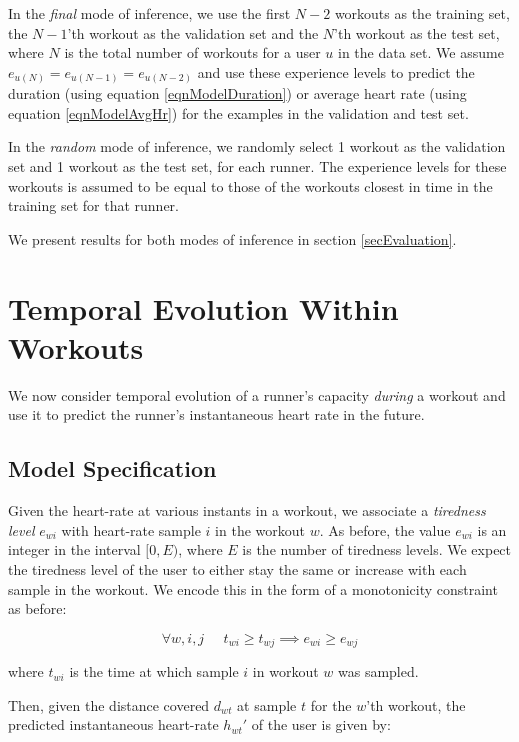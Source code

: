 \documentclass{acm_proc_article-sp}
\begin{document}
In the \emph{final} mode of inference, we use the first $N-2$ workouts as the training set, the $N-1$'th workout as the validation set and the $N$'th workout as the test set, where $N$ is the total number of workouts for a user $u$ in the data set. We assume $e_{u(N)} = e_{u(N-1)} = e_{u(N-2)}$ and use these experience levels to predict the duration (using equation \ref{eqnModelDuration}) or average heart rate (using equation \ref{eqnModelAvgHr}) for the examples in the validation and test set.

In the \emph{random} mode of inference, we randomly select 1 workout as the validation set and 1 workout as the test set, for each runner. The experience levels for these workouts is assumed to be equal to those of the workouts closest in time in the training set for that runner. 

We present results for both modes of inference in section \ref{secEvaluation}.

\section{Temporal Evolution Within \\ Workouts}
\label{secTemporalModelWorkouts}
We now consider temporal evolution of a runner's capacity \emph{during} a workout and use it to predict the runner's instantaneous heart rate in the future. 

\subsection{Model Specification}

Given the heart-rate at various instants in a workout, we associate a \emph{tiredness level} $e_{wi}$ with heart-rate sample $i$ in the workout $w$. As before, the value $e_{wi}$ is an integer in the interval $[0, E)$, where $E$ is the number of tiredness levels. We expect the tiredness level of the user to either stay the same or increase with each sample in the workout. We encode this in the form of a monotonicity constraint as before:

$$\forall w,i,j \;\;\;\;\; t_{wi} \geq t_{wj} \implies e_{wi} \geq e_{wj}$$

where $t_{wi}$ is the time at which sample $i$ in workout $w$ was sampled.

Then, given the distance covered $d_{wt}$ at sample $t$ for the $w$'th workout, the predicted instantaneous heart-rate $h_{wt}'$ of the user is given by:
\end{document}
